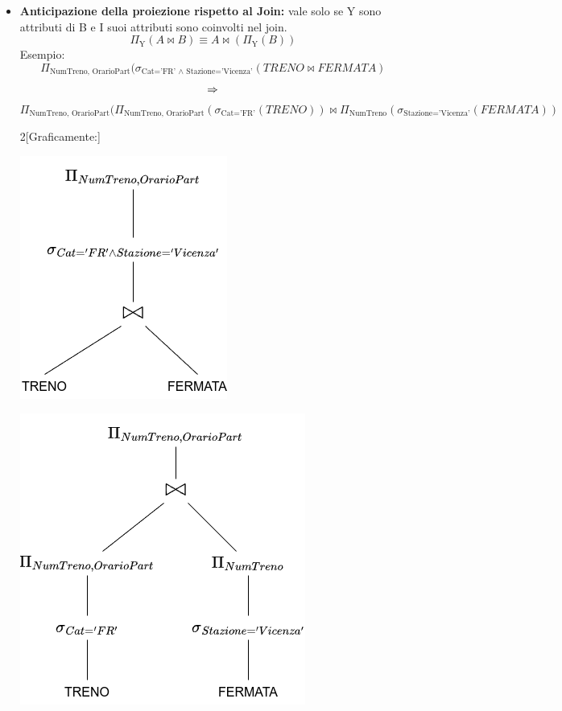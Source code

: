 \documentclass{report}
\begin{document}
\begin{itemize}
    \item \textbf{Anticipazione della proiezione rispetto al Join:} vale solo se Y sono attributi di B e I suoi attributi sono coinvolti nel join.\\
\[\Pi_\text{Y}(A \bowtie B) \equiv A \bowtie(\Pi_\text{Y}(B))\]
Esempio:
\[ \Pi_{\text{NumTreno, OrarioPart}}(\sigma_{\text{Cat='FR' $\wedge$ Stazione='Vicenza'}}(TRENO \bowtie FERMATA) \]
\[ \Large \Rightarrow \]
\[ \Pi_{\text{NumTreno, OrarioPart}}(\Pi_{\text{NumTreno, OrarioPart}}(\sigma_{\text{Cat='FR'}}(TRENO)) \bowtie \Pi_{\text{NumTreno}}(\sigma_{\text{Stazione='Vicenza'}}(FERMATA)) \]
\begin{multicols}{2}[Graficamente:]

\begin{center}\includegraphics[scale=0.45]{tree_example_transform}\end{center}
\begin{center}\includegraphics[scale=0.45]{tree_example_anticip_projection}\end{center}
\end{multicols}


\end{itemize}
\end{document}
